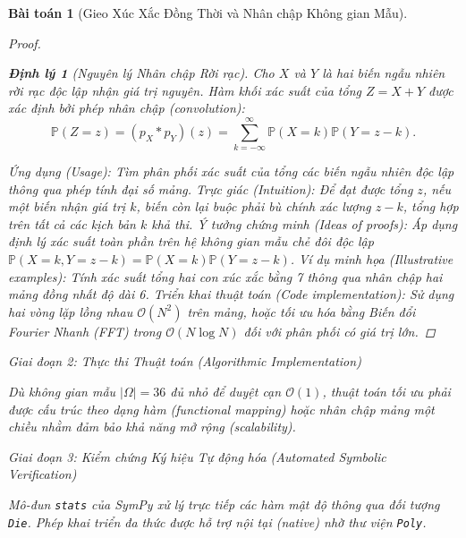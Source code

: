 \documentclass{article}
\newtheorem{baitoan}{Bài toán}
\newtheorem{dinhly}{Định lý}
\begin{document}
\begin{baitoan}[Gieo Xúc Xắc Đồng Thời và Nhân chập Không gian Mẫu]
\begin{proof}
\begin{dinhly}[Nguyên lý Nhân chập Rời rạc]
Cho $X$ và $Y$ là hai biến ngẫu nhiên rời rạc độc lập nhận giá trị nguyên. Hàm khối xác suất của tổng $Z = X + Y$ được xác định bởi phép nhân chập (convolution):
$$ \mathbb{P}(Z = z) = (p_X * p_Y)(z) = \sum_{k=-\infty}^{\infty} \mathbb{P}(X = k)\mathbb{P}(Y = z - k). $$
\end{dinhly}
\emph{Ứng dụng (Usage):} Tìm phân phối xác suất của tổng các biến ngẫu nhiên độc lập thông qua phép tính đại số mảng.
\emph{Trực giác (Intuition):} Để đạt được tổng $z$, nếu một biến nhận giá trị $k$, biến còn lại buộc phải bù chính xác lượng $z - k$, tổng hợp trên tất cả các kịch bản $k$ khả thi.
\emph{Ý tưởng chứng minh (Ideas of proofs):} Áp dụng định lý xác suất toàn phần trên hệ không gian mẫu chẻ đôi độc lập $\mathbb{P}(X=k, Y=z-k) = \mathbb{P}(X=k)\mathbb{P}(Y=z-k)$.
\emph{Ví dụ minh họa (Illustrative examples):} Tính xác suất tổng hai con xúc xắc bằng 7 thông qua nhân chập hai mảng đồng nhất độ dài 6.
\emph{Triển khai thuật toán (Code implementation):} Sử dụng hai vòng lặp lồng nhau $\mathcal{O}(N^2)$ trên mảng, hoặc tối ưu hóa bằng Biến đổi Fourier Nhanh (FFT) trong $\mathcal{O}(N \log N)$ đối với phân phối có giá trị lớn.

 \end{proof}

\vspace{0.5em}\noindent\emph{Giai đoạn 2: Thực thi Thuật toán (Algorithmic Implementation)}
 
 Dù không gian mẫu $|\Omega|=36$ đủ nhỏ để duyệt cạn $\mathcal{O}(1)$, thuật toán tối ưu phải được cấu trúc theo dạng hàm (functional mapping) hoặc nhân chập mảng một chiều nhằm đảm bảo khả năng mở rộng (scalability).



\vspace{0.5em}\noindent\emph{Giai đoạn 3: Kiểm chứng Ký hiệu Tự động hóa (Automated Symbolic Verification)}
 
 Mô-đun \texttt{stats} của \textsf{SymPy} xử lý trực tiếp các hàm mật độ thông qua đối tượng \texttt{Die}. Phép khai triển đa thức được hỗ trợ nội tại (native) nhờ thư viện \texttt{Poly}.




\end{baitoan}
\end{document}
